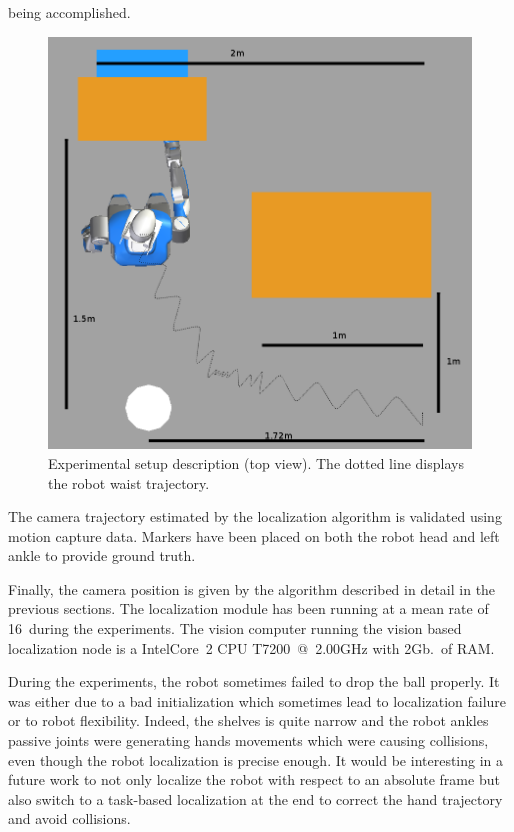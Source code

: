 being accomplished.
%
\begin{figure}[ht!]
  \begin{center}
    \includegraphics[width=\linewidth]{images/dimensions.png}
  \end{center}
  \caption{Experimental setup description (top view). The dotted line displays the robot waist trajectory.\label{fig:xp_setup_dim}}
\end{figure}
%
The camera trajectory estimated by the localization algorithm is validated using motion capture data. Markers have been placed on both the robot head and left ankle to provide ground truth.

Finally, the camera position is given by the algorithm described in detail in the previous sections. The localization module has been running at a mean rate of 16\hertz~during the experiments. The vision computer running the vision based localization node is a Intel\textregistered Core\texttrademark\ 2 CPU T7200~@~2.00GHz with 2Gb.\ of RAM.

During the experiments, the robot sometimes failed to drop the ball properly. It was either due to a bad initialization which sometimes lead to localization failure or to robot flexibility. Indeed, the shelves is quite narrow and the robot ankles passive joints were generating hands movements which were causing collisions, even though the robot localization is precise enough. It would be interesting in a
future work to not only localize the robot with respect to an absolute frame but also switch to a task-based localization at the end to correct the hand trajectory and avoid collisions.

